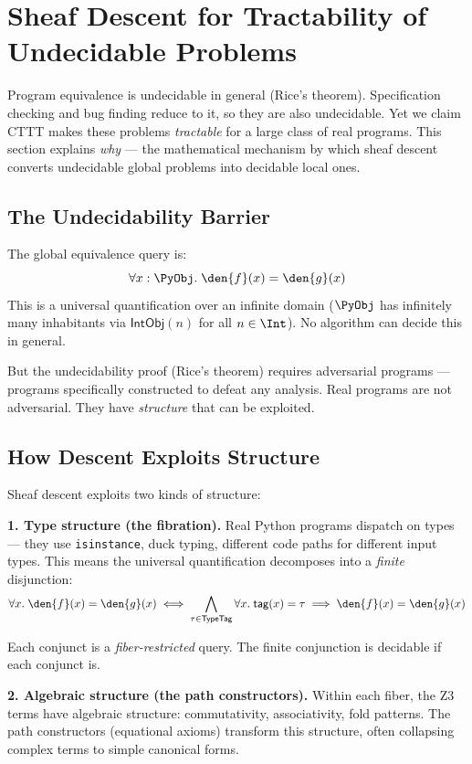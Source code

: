 \section{Sheaf Descent for Tractability of Undecidable Problems}
\label{sec:descent-tractability}

Program equivalence is undecidable in general (Rice's theorem).
Specification checking and bug finding reduce to it, so they are
also undecidable.  Yet we claim CTTT makes these problems
\emph{tractable} for a large class of real programs.  This section
explains \emph{why} --- the mathematical mechanism by which sheaf
descent converts undecidable global problems into decidable local ones.

\subsection{The Undecidability Barrier}

The global equivalence query is:
\[
  \forall x : \PyObj.\; \den{f}(x) = \den{g}(x)
\]
This is a universal quantification over an infinite domain ($\PyObj$
has infinitely many inhabitants via $\mathsf{IntObj}(n)$ for all
$n \in \Int$).  No algorithm can decide this in general.

But the undecidability proof (Rice's theorem) requires adversarial
programs --- programs specifically constructed to defeat any analysis.
Real programs are not adversarial.  They have \emph{structure} that
can be exploited.

\subsection{How Descent Exploits Structure}

Sheaf descent exploits two kinds of structure:

\textbf{1. Type structure (the fibration).}
Real Python programs dispatch on types --- they use
\texttt{isinstance}, duck typing, different code paths for different
input types.  This means the universal quantification decomposes
into a \emph{finite} disjunction:
\[
  \forall x.\; \den{f}(x) = \den{g}(x)
  \iff
  \bigwedge_{\tau \in \mathsf{TypeTag}} \forall x.\;
    \mathsf{tag}(x) = \tau \implies \den{f}(x) = \den{g}(x)
\]

Each conjunct is a \emph{fiber-restricted} query.  The finite
conjunction is decidable if each conjunct is.

\textbf{2. Algebraic structure (the path constructors).}
Within each fiber, the Z3 terms have algebraic structure:
commutativity, associativity, fold patterns.  The path constructors
(equational axioms) transform this structure, often collapsing
complex terms to simple canonical forms.

